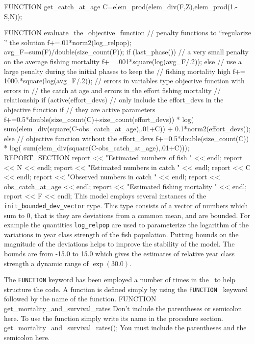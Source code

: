 \documentclass[12pt]{book}
\begin{document}
FUNCTION get_catch_at_age
  C=elem_prod(elem_div(F,Z),elem_prod(1.-S,N));

FUNCTION evaluate_the_objective_function
  // penalty functions to ``regularize '' the solution
  f+=.01*norm2(log_relpop);
  avg_F=sum(F)/double(size_count(F));
  if (last_phase())
  {
    // a very small penalty on the average fishing mortality
    f+= .001*square(log(avg_F/.2));
  }
  else
  {
    // use a large penalty during the initial phases to keep the
    // fishing mortality high
    f+= 1000.*square(log(avg_F/.2));
  }
  // errors in variables type objective function with errors in
  // the catch at age and errors in the effort fishing mortality
  // relationship
  if (active(effort_devs)
  {
    // only include the effort_devs in the objective function if
    // they are active parameters
    f+=0.5*double(size_count(C)+size_count(effort_devs))
      * log( sum(elem_div(square(C-obs_catch_at_age),.01+C))
      + 0.1*norm2(effort_devs));
  }
  else
  {
    // objective function without the effort_devs
    f+=0.5*double(size_count(C))
      * log( sum(elem_div(square(C-obs_catch_at_age),.01+C)));
  }
REPORT_SECTION
  report << "Estimated numbers of fish " << endl;
  report << N << endl; 
  report << "Estimated numbers in catch " << endl;
  report << C << endl; 
  report << "Observed numbers in catch " << endl;
  report << obs_catch_at_age << endl; 
  report << "Estimated fishing mortality " << endl;
  report << F << endl; 
\endexample
{}
This model employs several instances of the
{\tt init\_bounded\_dev\_vector} type.
This type consists of a vector of numbers which
sum to 0, that is they are deviations from a common mean,
and are bounded. For example the quantities {\tt log\_relpop}
are used to parameterize the logarithm of the variations in
year class strength of the fish population. Putting bounds on
the magnitude of the deviations helps to improve the stability of the model.
The bounds are from -15.0 to 15.0 which gives the estimates of
relative year class strength a dynamic range of $\exp(30.0)$. 

The {\tt FUNCTION} keyword has been employed a number of times
in the 
\PS\ to help structure the code. 
A function is defined simply by using the {\tt FUNCTION } keyword
followed by the name of the function.
\beginexample
FUNCTION get_mortality_and_survival_rates
\endexample
\noindent Don't include the parentheses or semicolon here.
To use the function simply write its name in the procedure
section. 
\beginexample
  get_mortality_and_survival_rates();
\endexample
\noindent You must include the parentheses and the semicolon here.
\end{document}
